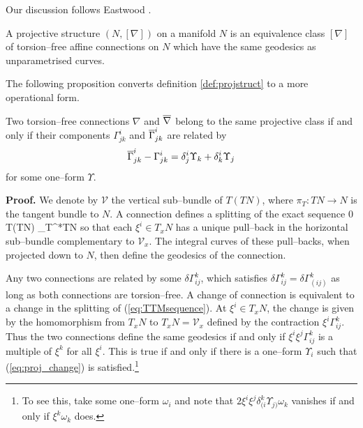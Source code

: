 Our discussion follows Eastwood \cite{Eastwood}.

\begin{defi}\label{def:projstruct} A projective structure $(N,[\nabla])$
on a manifold $N$ is an equivalence class $[\nabla]$ of torsion--free affine connections on $N$ which have the same geodesics as unparametrised curves.
\end{defi}

The following proposition converts definition \ref{def:projstruct} to a more operational form.

\begin{prop} Two torsion--free connections $\nabla$ and $\overline{\nabla}$ belong to the same projective class if and only if their components $\Gamma^i_{jk}$ and $\overline{\Gamma}^i_{jk}$ are related by
\begin{equation}
\overline{\Gamma}^i_{jk} - \Gamma^i_{jk} = \delta_{j}^{i}\Upsilon_{k}+\delta_{k}^{i}\Upsilon_{j}\label{eq:proj_change}
\end{equation}
for some one--form $\Upsilon.$
\end{prop}

{\bf Proof.} We denote by $\mathcal{V}$ the vertical sub--bundle of $T(TN)$, where $\pi_T:TN\rightarrow N$ is the tangent bundle to $N$. A connection defines a splitting of the exact sequence
\be \label{eq:TTMsequence}
0 \longrightarrow {} \longrightarrow T(TN) \longrightarrow \pi_T^*TN 
\ee
so that each $\xi^i\in T_xN$ has a unique pull--back in the horizontal sub--bundle complementary to $\mathcal{V}_x$. The integral curves of these pull--backs, when projected down to $N$, then define the geodesics of the connection.

Any two connections are related by some $\delta\Gamma^k_{ij}$, which satisfies $\delta\Gamma^k_{ij}=\delta\Gamma^k_{(ij)}$ as long as both connections are torsion--free. A change of connection is equivalent to a change in the splitting of (\ref{eq:TTMsequence}). At $\xi^i\in T_xN$, the change is given by the homomorphism from $T_xN$ to $T_xN=\mathcal{V}_x$ defined by the contraction $\xi^i\Gamma^k_{ij}$. Thus the two connections define the same geodesics if and only if $\xi^i\xi^j\Gamma^k_{ij}$ is a multiple of $\xi^k$ for all $\xi^i$. This is true if and only if there is a one--form $\Upsilon_i$ such that (\ref{eq:proj_change}) is satisfied.\footnote{To see this, take some one--form $\omega_i$ and note that $2\xi^i\xi^j\delta^k_{(i}\Upsilon_{j)}\omega_k$ vanishes if and only if $\xi^k\omega_k$ does.}
\koniec


